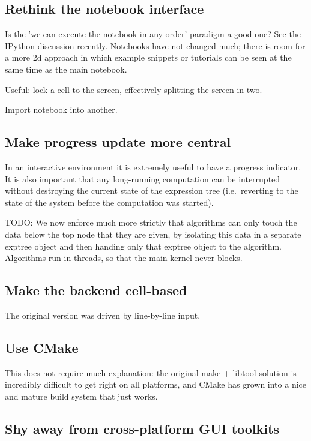 \documentclass[11pt]{article}
\begin{document}
\subsection{Rethink the notebook interface}

Is the 'we can execute the notebook in any order' paradigm a good one?
See the IPython discussion recently. Notebooks have not changed much;
there is room for a more 2d approach in which example snippets or
tutorials can be seen at the same time as the main notebook.

Useful: lock a cell to the screen, effectively splitting the screen in
two. 

Import notebook into another. 

\subsection{Make progress update more central}

In an interactive environment it is extremely useful to have a
progress indicator. It is also important that any long-running
computation can be interrupted without destroying the current state of
the expression tree (i.e.~reverting to the state of the system before
the computation was started). 

TODO: We now enforce much more strictly that algorithms can only touch the
data below the top node that they are given, by isolating this data in
a separate exptree object and then handing only that exptree object to
the algorithm. Algorithms run in threads, so that the main kernel
never blocks.

\subsection{Make the backend cell-based}

The original version was driven by line-by-line input, 


\subsection{Use CMake}

This does not require much explanation: the original make + libtool
solution is incredibly difficult to get right on all platforms, and
CMake has grown into a nice and mature build system that just works.

\subsection{Shy away from cross-platform GUI toolkits}
\end{document}
